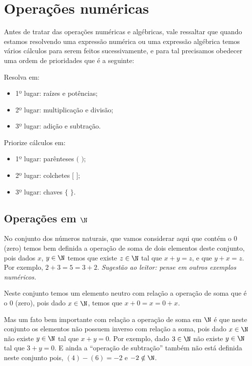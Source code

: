 
\chapter{Operações numéricas}
 Antes de tratar das operações numéricas e algébricas, vale ressaltar que quando estamos resolvendo uma expressão numérica ou uma expressão algébrica temos vários cálculos para serem feitos sucessivamente, e para tal precisamos obedecer uma ordem de prioridades que é a seguinte:

\begin{multicols}{2}
Resolva em:
\begin{itemize}
\item 1º lugar: raízes e potências;
\item 2º lugar: multiplicação e divisão;
\item 3º lugar: adição e subtração.
\end{itemize}

Priorize cálculos em:
\begin{itemize}
\item 1º lugar: parênteses $($ $)$;
\item 2º lugar: colchetes $[$ $]$;
\item 3º lugar: chaves $\{$ $\}$.
\end{itemize}
\end{multicols}

 \section{Operações em \texorpdfstring{$\N$}{N}}
 No conjunto dos números naturais, que vamos considerar aqui que contém o $0$ (zero) temos bem definida a operação de soma de dois elementos deste conjunto, pois dados $x$, $y \in \N$ temos que existe $z \in \N$ tal que $x+y=z$, e que $y+x=z$. Por exemplo, $2+3=5=3+2$. \emph{Sugestão ao leitor: pense em outros exemplos numéricos.}

 Neste conjunto temos um elemento neutro com relação a operação de soma que é o $0$ (zero), pois dado $x \in \N$, temos que $x+0=x=0+x$.

 Mas um fato bem importante com relação a operação de soma em $\N$ é que neste conjunto os elementos não possuem inverso com relação a soma, pois dado $x \in \N$ não existe $y \in \N$ tal que $x+y=0$. Por exemplo, dado $3 \in \N$ não existe $y \in \N$ tal que $3 + y=0$. E ainda a ``operação de subtração'' também não está definida neste conjunto pois, $(4)-(6)=-2$ e $-2 \notin \N$.

